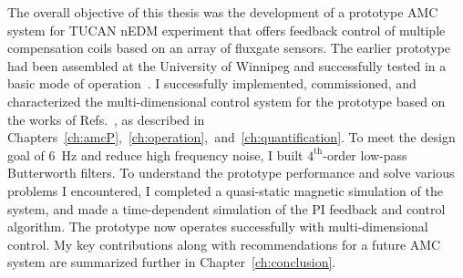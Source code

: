 The overall objective of this thesis was the development of a prototype AMC system for TUCAN nEDM experiment that offers feedback control of multiple compensation coils based on an array of fluxgate sensors. The earlier prototype had been assembled at the University of Winnipeg and successfully tested in a basic mode of operation~\cite{liam_presentation}. I successfully implemented, commissioned, and characterized the multi-dimensional control system for the prototype based on the works of Refs.~\cite{bea,lins}, as described in Chapters~\ref{ch:amcP},~\ref{ch:operation},~and~\ref{ch:quantification}. To meet the design goal of 6~Hz and reduce high frequency noise, I built $\mathrm{4^{th}}$-order low-pass Butterworth filters. To understand the prototype performance and solve various problems I encountered, I completed a quasi-static magnetic simulation of the system, and made a time-dependent simulation of the PI feedback and control algorithm. The prototype now operates successfully with multi-dimensional control. My key contributions along with recommendations for a future AMC system are summarized further in Chapter~\ref{ch:conclusion}.










